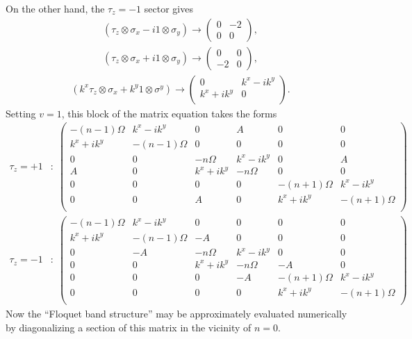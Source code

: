 \documentclass{article}
\newcommand{\ies}[1]{ \begin{equation*} \begin{split} #1 \end{split} \end{equation*}}
\begin{document}
On the other hand, the $\tau_z = -1$ sector gives
\ies{
   (\tau_z \otimes \sigma_x  -i 1 \otimes \sigma_y)
  \rightarrow
  \left(
  \begin{array}{cc}
    0&-2\\
    0&0
  \end{array}
  \right),
}
\ies{
   (\tau_z \otimes \sigma_x + i 1 \otimes \sigma_y)
  \rightarrow
  \left(
  \begin{array}{cc}
    0&0\\
     -2&0
  \end{array}
  \right),
}
\ies{
  (k^x \tau_z \otimes \sigma_x + k^y 1 \otimes \sigma^y)
  \rightarrow
  \left(
  \begin{array}{cc}
    0 & k^x - i k^y \\
    k^x + i k^y & 0 \\
  \end{array}
  \right).
}
Setting $v=1$, this block of the matrix equation takes the forms
\ies{
  \tau_z = +1 &: \;
  \left( \begin{array}{cccccc}
           -(n-1)\Omega & k^x - i k^y  & 0 & A & 0  &  0 \\
           k^x + ik^y & -(n-1) \Omega& 0 & 0 & 0 & 0 \\
           0 & 0 &  -n \Omega & k^x - i k^y & 0 & A  \\
           A & 0 & k^x + i k^y & - n \Omega & 0 & 0 \\
           0 & 0 & 0 & 0 & -(n+1) \Omega & k^x - i k^y \\
           0 & 0 & A & 0 & k^x + i k^y & - (n+1) \Omega \\
  \end{array} \right)
  \\
  \tau_z = -1 &: \;
  \left( \begin{array}{cccccc}
           -(n-1)\Omega & k^x - i k^y  & 0 & 0 & 0  &  0 \\
           k^x + ik^y & -(n-1) \Omega& -A & 0 & 0 & 0 \\
           0 & -A &  -n \Omega & k^x - i k^y & 0 & 0  \\
           0 & 0 & k^x + i k^y & - n \Omega & -A & 0 \\
           0 & 0 & 0 & -A & -(n+1) \Omega & k^x - i k^y \\
           0 & 0 & 0 & 0 & k^x + i k^y & - (n+1) \Omega \\
  \end{array} \right)
}
Now the ``Floquet band structure'' may be approximately evaluated numerically by diagonalizing a section of this matrix in the vicinity of $n=0$. 
\end{document}
